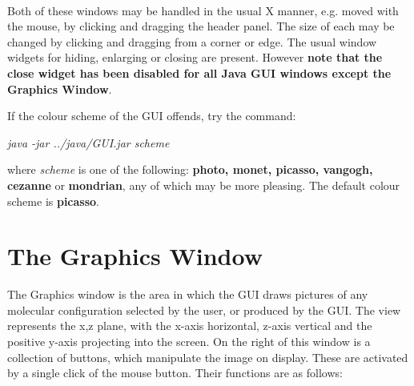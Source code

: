 ~

\noindent
Both of these windows may be handled in the usual X manner, e.g. moved
with the mouse, by clicking and dragging the header panel. The size of
each may be changed by clicking and dragging from a corner or
edge. The usual window widgets for hiding, enlarging or closing are
present. However {\bf note that the close widget has been disabled for
all Java GUI windows except the Graphics Window}.

If the colour scheme of the GUI offends, try the command:

\vspace{0.25cm}
{\em java -jar ../java/GUI.jar scheme}
\vspace{0.25cm}

\noindent where {\em scheme} is one of the following: {\bf photo,
monet, picasso, vangogh, cezanne} or {\bf mondrian}, 
any of which may be more pleasing. The default colour scheme 
is {\bf picasso}.

\section{The Graphics Window}

The Graphics window is the area in which the GUI draws pictures of any
molecular configuration selected by the user, or produced by the
GUI. The view represents the x,z plane, with the x-axis horizontal,
z-axis vertical and the positive y-axis projecting into the screen. On the
right of this window is a collection of buttons, which manipulate the
image on display. These are activated by a single click of the mouse
button. Their functions are as follows:

